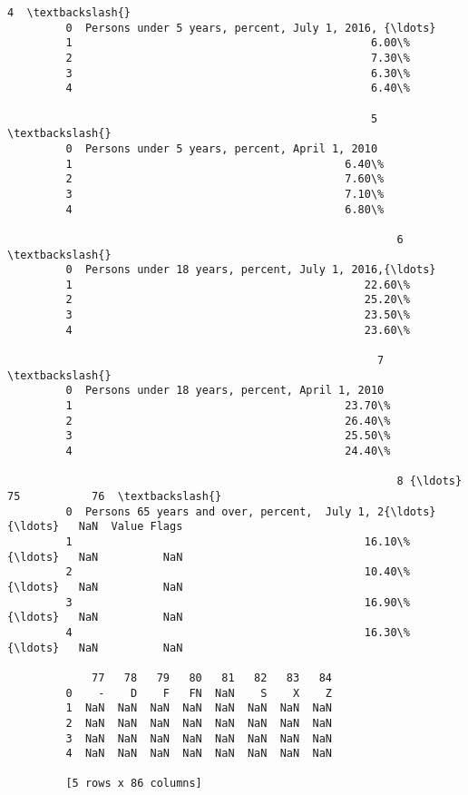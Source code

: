 \documentclass[11pt]{article}
\begin{document}
\begin{Verbatim}[commandchars=\\\{\}]
                                                            4  \textbackslash{}
         0  Persons under 5 years, percent, July 1, 2016, {\ldots}   
         1                                              6.00\%   
         2                                              7.30\%   
         3                                              6.30\%   
         4                                              6.40\%   
         
                                                        5  \textbackslash{}
         0  Persons under 5 years, percent, April 1, 2010   
         1                                          6.40\%   
         2                                          7.60\%   
         3                                          7.10\%   
         4                                          6.80\%   
         
                                                            6  \textbackslash{}
         0  Persons under 18 years, percent, July 1, 2016,{\ldots}   
         1                                             22.60\%   
         2                                             25.20\%   
         3                                             23.50\%   
         4                                             23.60\%   
         
                                                         7  \textbackslash{}
         0  Persons under 18 years, percent, April 1, 2010   
         1                                          23.70\%   
         2                                          26.40\%   
         3                                          25.50\%   
         4                                          24.40\%   
         
                                                            8 {\ldots}    75           76  \textbackslash{}
         0  Persons 65 years and over, percent,  July 1, 2{\ldots} {\ldots}   NaN  Value Flags   
         1                                             16.10\% {\ldots}   NaN          NaN   
         2                                             10.40\% {\ldots}   NaN          NaN   
         3                                             16.90\% {\ldots}   NaN          NaN   
         4                                             16.30\% {\ldots}   NaN          NaN   
         
             77   78   79   80   81   82   83   84  
         0    -    D    F   FN  NaN    S    X    Z  
         1  NaN  NaN  NaN  NaN  NaN  NaN  NaN  NaN  
         2  NaN  NaN  NaN  NaN  NaN  NaN  NaN  NaN  
         3  NaN  NaN  NaN  NaN  NaN  NaN  NaN  NaN  
         4  NaN  NaN  NaN  NaN  NaN  NaN  NaN  NaN  
         
         [5 rows x 86 columns]
\end{Verbatim}
            
\end{document}
